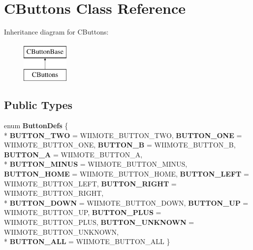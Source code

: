 \hypertarget{class_c_buttons}{\section{C\-Buttons Class Reference}
\label{class_c_buttons}
}
Inheritance diagram for C\-Buttons\-:\begin{figure}[H]
\begin{center}
\leavevmode
\includegraphics[height=2.000000cm]{class_c_buttons}
\end{center}
\end{figure}
\subsection*{Public Types}
\begin{DoxyCompactItemize}
\item 
enum {\bfseries Button\-Defs} \{ \\*
{\bfseries B\-U\-T\-T\-O\-N\-\_\-\-T\-W\-O} =  W\-I\-I\-M\-O\-T\-E\-\_\-\-B\-U\-T\-T\-O\-N\-\_\-\-T\-W\-O, 
{\bfseries B\-U\-T\-T\-O\-N\-\_\-\-O\-N\-E} =  W\-I\-I\-M\-O\-T\-E\-\_\-\-B\-U\-T\-T\-O\-N\-\_\-\-O\-N\-E, 
{\bfseries B\-U\-T\-T\-O\-N\-\_\-\-B} =  W\-I\-I\-M\-O\-T\-E\-\_\-\-B\-U\-T\-T\-O\-N\-\_\-\-B, 
{\bfseries B\-U\-T\-T\-O\-N\-\_\-\-A} =  W\-I\-I\-M\-O\-T\-E\-\_\-\-B\-U\-T\-T\-O\-N\-\_\-\-A, 
\\*
{\bfseries B\-U\-T\-T\-O\-N\-\_\-\-M\-I\-N\-U\-S} =  W\-I\-I\-M\-O\-T\-E\-\_\-\-B\-U\-T\-T\-O\-N\-\_\-\-M\-I\-N\-U\-S, 
{\bfseries B\-U\-T\-T\-O\-N\-\_\-\-H\-O\-M\-E} =  W\-I\-I\-M\-O\-T\-E\-\_\-\-B\-U\-T\-T\-O\-N\-\_\-\-H\-O\-M\-E, 
{\bfseries B\-U\-T\-T\-O\-N\-\_\-\-L\-E\-F\-T} =  W\-I\-I\-M\-O\-T\-E\-\_\-\-B\-U\-T\-T\-O\-N\-\_\-\-L\-E\-F\-T, 
{\bfseries B\-U\-T\-T\-O\-N\-\_\-\-R\-I\-G\-H\-T} =  W\-I\-I\-M\-O\-T\-E\-\_\-\-B\-U\-T\-T\-O\-N\-\_\-\-R\-I\-G\-H\-T, 
\\*
{\bfseries B\-U\-T\-T\-O\-N\-\_\-\-D\-O\-W\-N} =  W\-I\-I\-M\-O\-T\-E\-\_\-\-B\-U\-T\-T\-O\-N\-\_\-\-D\-O\-W\-N, 
{\bfseries B\-U\-T\-T\-O\-N\-\_\-\-U\-P} =  W\-I\-I\-M\-O\-T\-E\-\_\-\-B\-U\-T\-T\-O\-N\-\_\-\-U\-P, 
{\bfseries B\-U\-T\-T\-O\-N\-\_\-\-P\-L\-U\-S} =  W\-I\-I\-M\-O\-T\-E\-\_\-\-B\-U\-T\-T\-O\-N\-\_\-\-P\-L\-U\-S, 
{\bfseries B\-U\-T\-T\-O\-N\-\_\-\-U\-N\-K\-N\-O\-W\-N} =  W\-I\-I\-M\-O\-T\-E\-\_\-\-B\-U\-T\-T\-O\-N\-\_\-\-U\-N\-K\-N\-O\-W\-N, 
\\*
{\bfseries B\-U\-T\-T\-O\-N\-\_\-\-A\-L\-L} =  W\-I\-I\-M\-O\-T\-E\-\_\-\-B\-U\-T\-T\-O\-N\-\_\-\-A\-L\-L
 \}
\end{DoxyCompactItemize}
